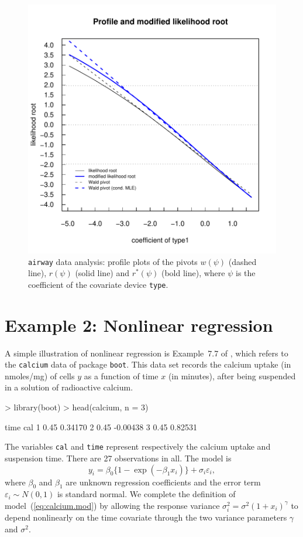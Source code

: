 \documentclass[a4paper,11pt]{article}
\def\code{\texttt}
\begin{document}
\begin{figure}[tph]
\includegraphics{Rnews-paper-009}
\caption{
\code{airway} data analysis: profile plots of the pivots $w(\psi)$ (dashed line), $r(\psi)$ (solid line) and $r^*(\psi)$ (bold line), where $\psi$ is the coefficient of the covariate device \code{type}.}
\label{fig:pivot.airway}
\end{figure}


\section*{Example 2: Nonlinear regression}
%
A simple illustration of nonlinear regression is Example~7.7 of \citet{davison.hinkley:1997}, which refers to the \code{calcium} data of package \code{boot}.  This data set records the calcium uptake (in nmoles/mg) of cells $y$ as a function of time $x$ (in minutes), after being suspended in a solution of radioactive calcium.  
%
\begin{Schunk}
\begin{Sinput}
> library(boot)
> head(calcium, n = 3)
\end{Sinput}
\begin{Soutput}
  time      cal
1 0.45  0.34170
2 0.45 -0.00438
3 0.45  0.82531
\end{Soutput}
\end{Schunk}
%
The variables \code{cal} and \code{time} represent respectively the calcium uptake and suspension time.  There are 27 observations in all.  The model is 
%
\begin{equation}
\label{eq:calcium.mod}
y_i = \beta_0\{1-\exp(-\beta_1x_i)\} + \sigma_i\varepsilon_i,
\end{equation}
%
where $\beta_0$ and $\beta_1$ are unknown regression coefficients and the error term $\varepsilon_i \sim N(0,1)$ is standard normal.  We complete the definition of model~(\ref{eq:calcium.mod}) by allowing the response variance $\sigma^2_i = \sigma^2(1+x_i)^\gamma$ to depend nonlinearly on the time covariate through the two variance parameters $\gamma$ and $\sigma^2$.  
\end{document}
